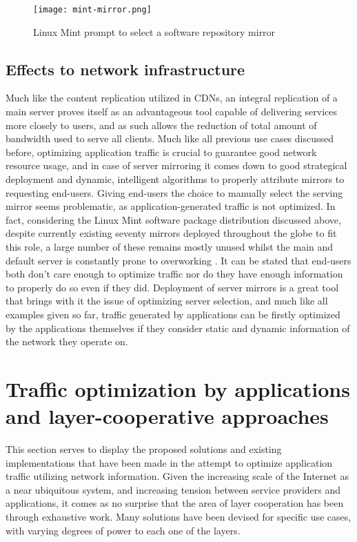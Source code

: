    \begin{figure}[!h]
    \centering
    \texttt{[image: mint-mirror.png]}
    \caption{Linux Mint prompt to select a software repository mirror}
    \label{fig:mint-mirrors}
    \end{figure}

    \subsection{Effects to network infrastructure}

        Much like the content replication utilized in CDNs, an integral replication of a main server proves itself as an advantageous tool capable of delivering services more closely to users, and as such allows the reduction of total amount of bandwidth used to serve all clients.
        Much like all previous use cases discussed before, optimizing application traffic is crucial to guarantee good network resource usage, and in case of server mirroring it comes down to good strategical deployment and dynamic, intelligent algorithms to properly attribute mirrors to requesting end-users.
        Giving end-users the choice to manually select the serving mirror seems problematic, as application-generated traffic is not optimized.
        In fact, considering the Linux Mint software package distribution discussed above, despite currently existing seventy mirrors deployed throughout the globe to fit this role, a large number of these remains mostly unused whilst the main and default server is constantly prone to overworking \cite{mint-article}.
        It can be stated that end-users both don't care enough to optimize traffic nor do they have enough information to properly do so even if they did.
        Deployment of server mirrors is a great tool that brings with it the issue of optimizing server selection, and much like all examples given so far, traffic generated by applications can be firstly optimized by the applications themselves if they consider static and dynamic information of the network they operate on.


    \section{Traffic optimization by applications and layer-cooperative approaches}

        This section serves to display the proposed solutions and existing implementations that have been made in the attempt to optimize application traffic utilizing network information.
        Given the increasing scale of the Internet as a near ubiquitous system, and increasing tension between service providers and applications, it comes as no surprise that the area of layer cooperation has been through exhaustive work.
        Many solutions have been devised for specific use cases, with varying degrees of power to each one of the layers.

